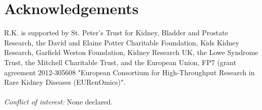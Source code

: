 
\section*{Acknowledgements}

R.K. is supported by St. Peter's Trust for Kidney, Bladder and Prostate Research, the David and Elaine Potter Charitable Foundation, Kids Kidney Research, Garfield Weston Foundation, Kidney Research UK, the Lowe Syndrome Trust, the Mitchell Charitable Trust, and the European Union, FP7 (grant agreement 2012-305608 "European Consortium for High-Throughput Research in Rare Kidney Diseases (EURenOmics)".\\\
\\
\noindent
\textit{Conflict of interest:} None declared.



